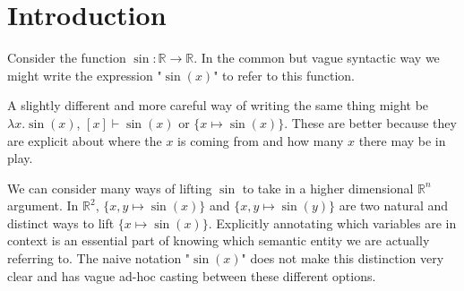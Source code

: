 \documentclass{article}%
\newcommand{\bR}{\mathbb{R}}
\begin{document}




\section{Introduction}

Consider the function $\sin : \mathbb{R} \rightarrow \mathbb{R}$. In the common but vague syntactic way we might write the expression "$\sin(x)$" to refer to this function. 

A slightly different and more careful way of writing the same thing might be $\lambda x. \sin(x)$, $[x] \vdash \sin(x)$ or $\{ x \mapsto \sin(x) \}$. These are better because they are explicit about where the $x$ is coming from and how many $x$ there may be in play.

We can consider many ways of lifting $\sin$ to take in a higher dimensional $\mathbb{R}^n$ argument. In $\bR^2$, $\{ x,y \mapsto \sin(x) \}$ and $\{ x,y \mapsto \sin(y) \}$ are two natural and distinct ways to lift $\{ x \mapsto \sin(x) \}$. Explicitly annotating which variables are in context is an essential part of knowing which semantic entity we are actually referring to. The naive notation "$\sin(x)$" does not make this distinction very clear and has vague ad-hoc casting between these different options.
\end{document}
